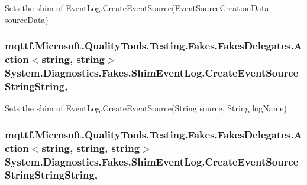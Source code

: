 Sets the shim of Event\-Log.\-Create\-Event\-Source(\-Event\-Source\-Creation\-Data source\-Data)

\hypertarget{class_system_1_1_diagnostics_1_1_fakes_1_1_shim_event_log_a6e2cddb433c8f1827db2bedbdf368fd0}{
\subsubsection[{Create\-Event\-Source\-String\-String}]{\setlength{\rightskip}{0pt plus 5cm}mqttf.\-Microsoft.\-Quality\-Tools.\-Testing.\-Fakes.\-Fakes\-Delegates.\-Action$<$string, string$>$ System.\-Diagnostics.\-Fakes.\-Shim\-Event\-Log.\-Create\-Event\-Source\-String\-String\hspace{0.3cm}{\ttfamily [static]}, {\ttfamily [set]}}}\label{class_system_1_1_diagnostics_1_1_fakes_1_1_shim_event_log_a6e2cddb433c8f1827db2bedbdf368fd0}


Sets the shim of Event\-Log.\-Create\-Event\-Source(\-String source, String log\-Name)

\hypertarget{class_system_1_1_diagnostics_1_1_fakes_1_1_shim_event_log_a27f06400f6420b4033f5402daab7c63f}{
\subsubsection[{Create\-Event\-Source\-String\-String\-String}]{\setlength{\rightskip}{0pt plus 5cm}mqttf.\-Microsoft.\-Quality\-Tools.\-Testing.\-Fakes.\-Fakes\-Delegates.\-Action$<$string, string, string$>$ System.\-Diagnostics.\-Fakes.\-Shim\-Event\-Log.\-Create\-Event\-Source\-String\-String\-String\hspace{0.3cm}{\ttfamily [static]}, {\ttfamily [set]}}}\label{class_system_1_1_diagnostics_1_1_fakes_1_1_shim_event_log_a27f06400f6420b4033f5402daab7c63f}


